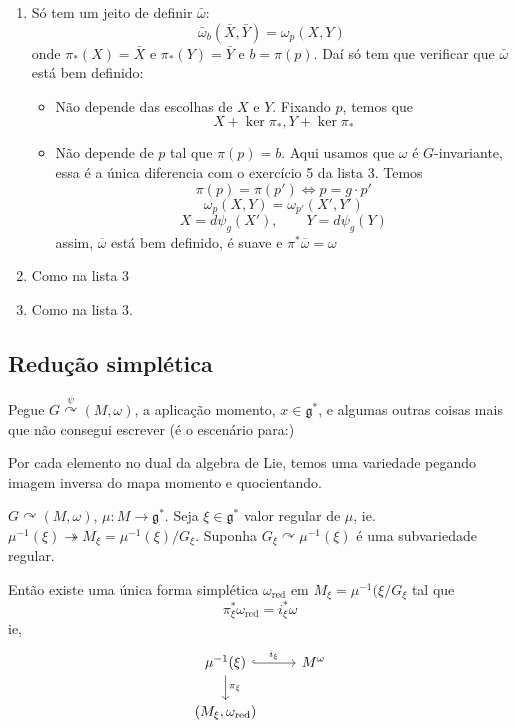 \begin{prop}\leavevmode
	\begin{enumerate}
		\item Só tem um jeito de definir $\bar{\omega} $:
	\[\bar{\omega}_b (\bar{X},\bar{Y})=\omega_p(X,Y)\]
	onde $\pi_*(X)=\bar{X}$ e $\pi_*(Y)=\bar{Y}$ e $b=\pi(p)$. Daí só tem que verificar que $\bar{\omega} $ está bem definido:
	\begin{itemize}
	\item Não depende das escolhas de $X$ e $Y$. Fixando $p$, temos que
		\[X+\ker \pi_*,Y+\ker \pi_*\]
	\item Não depende de $p$ tal que $\pi(p)=b$. Aqui usamos que $\omega$ é $G$-invariante, {\color{4}essa é a única diferencia com o exercício 5 da lista 3}. Temos
		\[\pi(p)=\pi(p')\iff p=g\cdot p'\]
		\[\omega_p (X,Y)=\omega_{p'}(X',Y')\]
		\[X=d\psi_g(X'),\qquad Y=d\psi_g(Y)\]
		assim, $\overline{\omega}$ está bem definido, é suave e $\pi^*\overline{\omega}=\omega$ 
	\end{itemize}
	\item Como na lista 3
	\item Como na lista 3.
	\end{enumerate}
\end{prop}

\subsection{Redução simplética}

Pegue $G\overset{\psi}{\curvearrowright}(M,\omega)$, a aplicação momento, $x\in\mathfrak{g}^*$, e algumas outras coisas mais que não consegui escrever (é o escenário para:)

\begin{thm}\leavevmode
{\color{4}Por cada elemento no dual da algebra de Lie, temos uma variedade pegando imagem inversa do mapa momento e quocientando.}

	$G\curvearrowright(M,\omega)$, $\mu:M\longrightarrow \mathfrak{g}^*$. Seja $\xi\in\mathfrak{g}^*$ valor regular de $\mu$, ie. $\mu^{-1}(\xi)\twoheadrightarrow M_\xi=\mu^{-1}(\xi)/G_\xi$. Suponha $G_\xi\curvearrowright \mu^{-1}(\xi)$ é uma subvariedade regular.

Então existe uma única forma simplética $\omega_{\operatorname{red}}$ em $M_\xi=\mu^{-1}(\xi/G_\xi$ tal que
\[\pi^* _\xi\omega_{\operatorname{red}}=i^*_\xi\omega\]
ie,
\[\begin{tikzcd}
	\mu^{-1}(\xi)\arrow[r,hook,"i_\xi"]\arrow[d,"\pi_\xi"]& M^\omega\\
	(M_\xi,\omega_{\operatorname{red}})
\end{tikzcd}\]
\end{thm}

